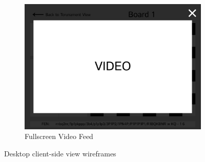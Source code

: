 \begin{figure}[h!]
    \vspace{1em}

    \begin{subfigure}[h!]{0.45\linewidth}
        \centering
        \includegraphics[width=\linewidth]{figures/methods/wireframes/desktop-full-screen-video-view.png}
        \caption{Fullscreen Video Feed}
        \label{fig:desktop-fullscreen-video}
    \end{subfigure}
    
    \caption{Desktop client-side view wireframes}
    \label{fig:desktop-view-group}
\end{figure}

